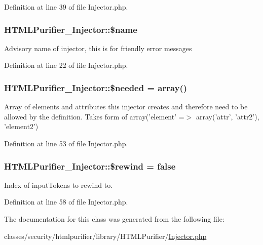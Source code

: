 Definition at line 39 of file Injector.\+php.

\hypertarget{classHTMLPurifier__Injector_a15efeb72d86f022fc99513f8d5de5bac}{
\subsubsection[{\$name}]{\setlength{\rightskip}{0pt plus 5cm}H\+T\+M\+L\+Purifier\+\_\+\+Injector\+::\$name}}\label{classHTMLPurifier__Injector_a15efeb72d86f022fc99513f8d5de5bac}
Advisory name of injector, this is for friendly error messages 

Definition at line 22 of file Injector.\+php.

\hypertarget{classHTMLPurifier__Injector_ae8c48ddbf7a7bd826a8c7a2ce3ab081d}{
\subsubsection[{\$needed}]{\setlength{\rightskip}{0pt plus 5cm}H\+T\+M\+L\+Purifier\+\_\+\+Injector\+::\$needed = array()}}\label{classHTMLPurifier__Injector_ae8c48ddbf7a7bd826a8c7a2ce3ab081d}
Array of elements and attributes this injector creates and therefore need to be allowed by the definition. Takes form of array('element' =$>$ array('attr', 'attr2'), 'element2') 

Definition at line 53 of file Injector.\+php.

\hypertarget{classHTMLPurifier__Injector_a0196cdb677f22f5d021fad631c785c2e}{
\subsubsection[{\$rewind}]{\setlength{\rightskip}{0pt plus 5cm}H\+T\+M\+L\+Purifier\+\_\+\+Injector\+::\$rewind = false\hspace{0.3cm}{\ttfamily [protected]}}}\label{classHTMLPurifier__Injector_a0196cdb677f22f5d021fad631c785c2e}
Index of input\+Tokens to rewind to. 

Definition at line 58 of file Injector.\+php.



The documentation for this class was generated from the following file\+:\begin{DoxyCompactItemize}
\item 
classes/security/htmlpurifier/library/\+H\+T\+M\+L\+Purifier/\hyperlink{Injector_8php}{Injector.\+php}\end{DoxyCompactItemize}
